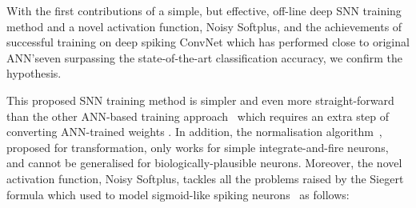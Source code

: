 With the first contributions of a simple, but effective, off-line deep SNN training method and a novel activation function, Noisy Softplus, and the achievements of successful training on \DIFdelbegin {}\DIFdelend \DIFaddbegin {}\DIFaddend deep spiking ConvNet which has performed close to \DIFaddbegin {}\DIFaddend original ANN's\DIFaddbegin \DIFadd{, }\DIFaddend even surpassing the state-of-the-art classification accuracy, we confirm the hypothesis. 

This proposed SNN training method is simpler and even more straight-forward than the other ANN-based training approach~\citep{cao2015spiking,diehl2015fast} which requires an extra step of converting ANN-trained weights \DIFdelbegin {}\DIFdelend \DIFaddbegin {}\DIFaddend .
In addition, the normalisation algorithm~\citep{diehl2015fast}, proposed for \DIFdelbegin {}\DIFdelend \DIFaddbegin {}\DIFaddend transformation, only works for simple integrate-and-fire neurons, and cannot be generalised for biologically-plausible neurons.
Moreover, the novel activation function, Noisy Softplus, tackles all the problems raised by the Siegert formula which \DIFaddbegin {}\DIFaddend used to model sigmoid-like spiking neurons~\citep{Jug_etal_2012} as follows: 
